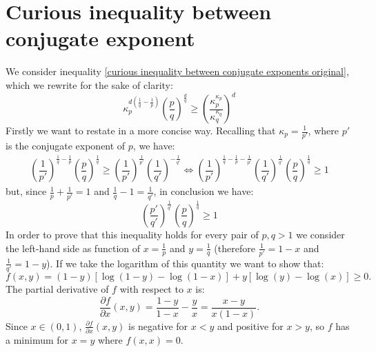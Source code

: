 \documentclass[corpo=11pt, stile=classica, tipotesi=custom,
greek, evenboxes, english]{toptesi}
\numberwithin{equation}{chapter}
\theoremstyle{remark}
\newcommand{\pdfrac}[2]{\dfrac{\partial #1}{\partial #2}}
\newcommand{\pfrac}[2]{\frac{\partial #1}{\partial #2}}
\begin{document}
\section{Curious inequality between conjugate exponent}\label{curious inequality between conjugate exponents}
We consider inequality \eqref{curious inequality between conjugate exponents original}, which we rewrite for the sake of clarity:
\begin{equation*}
	\kappa_p^{d\left(\frac1q - \frac1p\right)}\left(\dfrac{p}{q}\right)^{\frac{d}{q}} \geq \left(\dfrac{\kappa_p^{\kappa_p}}{\kappa_q^{\kappa_q}}\right)^d
\end{equation*}
Firstly we want to restate in a more concise way. Recalling that $\kappa_p =\frac{1}{p'}$, where $p'$ is the conjugate exponent of $p$, we have:
\begin{align*}
	\left(\dfrac{1}{p'}\right)^{\frac{1}{q}-\frac{1}{p}}\left(\dfrac{p}{q}\right)^{\frac{1}{q}} \geq \left(\dfrac{1}{p'}\right)^{\frac{1}{p'}} \left(\dfrac{1}{q'}\right)^{-\frac{1}{q'}}\iff \left(\dfrac{1}{p'}\right)^{\frac{1}{q}-\frac{1}{p} - \frac{1}{p'}}\left(\dfrac{1}{q'}\right)^{\frac{1}{q'}} \left(\dfrac{p}{q}\right)^{\frac{1}{q}} \geq 1
\end{align*}
but, since $\frac{1}{p}+\frac{1}{p'}=1$ and $\frac{1}{q} - 1 = \frac{1}{q'}$, in conclusion we have:
\begin{equation*}
	\left(\dfrac{p'}{q'}\right)^{\frac1{q'}} \left(\dfrac{p}{q}\right)^{\frac{1}{q}} \geq 1
\end{equation*}
In order to prove that this inequality holds for every pair of $p,q>1$ we consider the left-hand side as function of $x=\frac{1}{p}$ and $y=\frac{1}{q}$ (therefore $\frac{1}{p'} = 1-x$ and $\frac{1}{q'} = 1-y$). If we take the logarithm of this quantity we want to show that:
	\begin{equation*}
		f(x,y) = (1-y)\left[\log(1-y) - \log(1-x)\right] + y\left[\log(y) - \log(x)\right] \geq 0.
	\end{equation*}
	The partial derivative of $f$ with respect to $x$ is:
	\begin{equation*}
		\pdfrac{f}{x}(x,y) = \dfrac{1-y}{1-x} - \dfrac{y}{x} = \dfrac{x-y}{x(1-x)}.
	\end{equation*}
	Since $x \in (0,1)$, $\pfrac{f}{x}(x,y)$ is negative for $x<y$ and positive for $x>y$, so $f$ has a minimum for $x=y$ where $f(x,x) = 0$.
\end{document}
